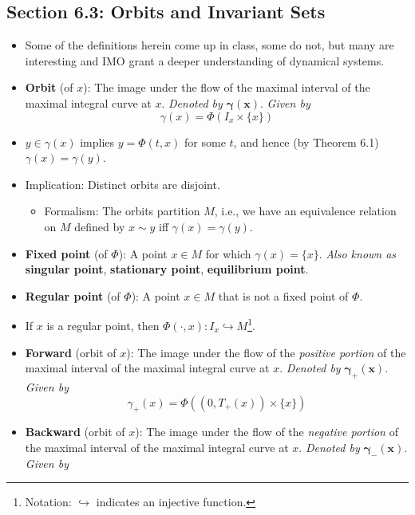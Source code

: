 \documentclass[../notes.tex]{subfiles}
\begin{document}
\subsection*{Section 6.3: Orbits and Invariant Sets}
\begin{itemize}
    \item Some of the definitions herein come up in class, some do not, but many are interesting and IMO grant a deeper understanding of dynamical systems.
    \item \textbf{Orbit} (of $x$): The image under the flow of the maximal interval of the maximal integral curve at $x$. \emph{Denoted by} $\bm{\gamma(x)}$. \emph{Given by}
    \begin{equation*}
        \gamma(x) = \Phi(I_x\times\{x\})
    \end{equation*}
    \item $y\in\gamma(x)$ implies $y=\Phi(t,x)$ for some $t$, and hence (by Theorem 6.1) $\gamma(x)=\gamma(y)$.
    \item Implication: Distinct orbits are disjoint.
    \begin{itemize}
        \item Formalism: The orbits partition $M$, i.e., we have an equivalence relation on $M$ defined by $x\sim y$ iff $\gamma(x)=\gamma(y)$.
    \end{itemize}
    \item \textbf{Fixed point} (of $\Phi$): A point $x\in M$ for which $\gamma(x)=\{x\}$. \emph{Also known as} \textbf{singular point}, \textbf{stationary point}, \textbf{equilibrium point}.
    \item \textbf{Regular point} (of $\Phi$): A point $x\in M$ that is not a fixed point of $\Phi$.
    \item If $x$ is a regular point, then $\Phi(\cdot,x):I_x\hookrightarrow M$\footnote{Notation: $\hookrightarrow$ indicates an injective function.}.
    \item \textbf{Forward} (orbit of $x$): The image under the flow of the \emph{positive portion} of the maximal interval of the maximal integral curve at $x$. \emph{Denoted by} $\bm{\gamma_+(x)}$. \emph{Given by}
    \begin{equation*}
        \gamma_+(x) = \Phi((0,T_+(x))\times\{x\})
    \end{equation*}
    \item \textbf{Backward} (orbit of $x$): The image under the flow of the \emph{negative portion} of the maximal interval of the maximal integral curve at $x$. \emph{Denoted by} $\bm{\gamma_-(x)}$. \emph{Given by}

\end{itemize}
\end{document}
